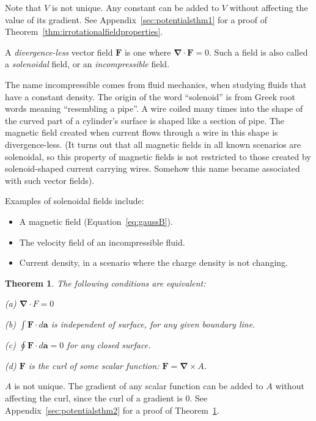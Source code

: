 \documentclass[a4paper]{article}
\theoremstyle{plain}
\newtheorem{theorem}{Theorem}
\theoremstyle{definition}
\newcommand{\vect}[1]{\textbf{#1}}
\newcommand{\del}{\bm{\nabla}}
\begin{document}
Note that $V$ is not unique.  Any constant can be added to $V$ without
affecting the value of its gradient.
See Appendix~\ref{sec:potentialsthm1} for a proof of
Theorem~\ref{thm:irrotationalfieldproperties}.

A {\em divergence-less} vector field $\vect{F}$ is one where
$\del \cdot \vect{F} = 0$.
Such a field is also called a {\em solenoidal} field,
or an {\em incompressible} field.

The name incompressible comes from fluid mechanics, when studying
fluids that have a constant density.
The origin of the word ``solenoid'' is from Greek root words meaning
``resembling a pipe''.  A wire coiled many times into the shape of the
curved part of a cylinder's surface is shaped like a section of pipe.
The magnetic field created when current flows through a wire in this
shape is divergence-less.  (It turns out that all magnetic fields in
all known scenarios are solenoidal, so this property of magnetic
fields is not restricted to those created by solenoid-shaped current
carrying wires.  Somehow this name became associated with such vector
fields).

Examples of solenoidal fields include:
\begin{itemize}
\item A magnetic field (Equation~\eqref{eq:gaussB}).
\item The velocity field of an incompressible fluid.
\item Current density, in a scenario where the charge density is not
  changing.
\end{itemize}

\begin{theorem}
\label{thm:solenoidalfieldproperties}
The following conditions are equivalent:

(a) $\del \cdot F = 0$

(b) $\int \vect{F} \cdot d\vect{a}$ is independent of surface, for any
given boundary line.

(c) $\oint \vect{F} \cdot d\vect{a} = 0$ for any closed surface.

(d) $\vect{F}$ is the curl of some scalar function:
$\vect{F} = \del \times A$.
\end{theorem}

$A$ is not unique.  The gradient of any scalar function can be added
to $A$ without affecting the curl, since the curl of a gradient is 0.
See Appendix~\ref{sec:potentialsthm2} for
a proof of Theorem~\ref{thm:solenoidalfieldproperties}.
\end{document}
